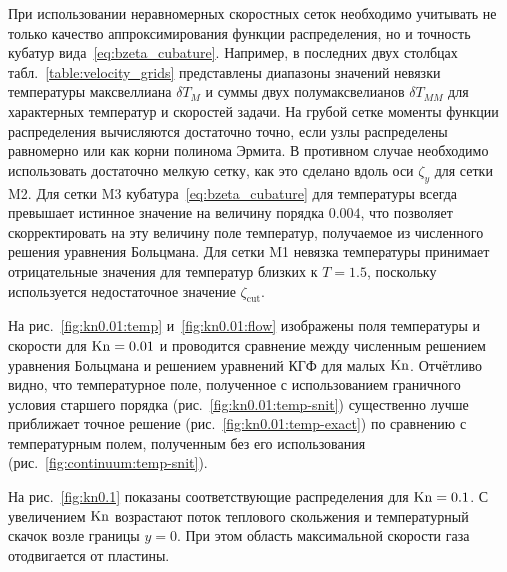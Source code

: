 При использовании неравномерных скоростных сеток необходимо учитывать не только качество аппроксимирования
функции распределения, но и точность кубатур вида~\eqref{eq:bzeta_cubature}.
Например, в последних двух столбцах табл.~\ref{table:velocity_grids} представлены диапазоны значений
невязки температуры максвеллиана \(\delta T_M\) и суммы двух полумаксвелианов \(\delta T_{MM}\)
для характерных температур и скоростей задачи.
На грубой сетке моменты функции распределения вычисляются достаточно точно,
если узлы распределены равномерно или как корни полинома Эрмита.
В противном случае необходимо использовать достаточно мелкую сетку,
как это сделано вдоль оси \(\zeta_y\) для сетки M2.
Для сетки M3 кубатура~\eqref{eq:bzeta_cubature} для температуры всегда превышает истинное значение
на величину порядка \(0.004\), что позволяет скорректировать на эту величину поле температур,
получаемое из численного решения уравнения Больцмана.
Для сетки M1 невязка температуры принимает отрицательные значения для температур близких к \(T=1.5\),
поскольку используется недостаточное значение \(\zeta_{\mathrm{cut}}\).

На рис.~\ref{fig:kn0.01:temp} и~\ref{fig:kn0.01:flow} изображены поля температуры и скорости
для \(\mathrm{Kn}=0.01\) и проводится сравнение между численным решением уравнения Больцмана
и решением уравнений КГФ для малых \(\mathrm{Kn}\).
Отчётливо видно, что температурное поле, полученное с использованием
граничного условия старшего порядка (рис.~\ref{fig:kn0.01:temp-snit})
существенно лучше приближает точное решение (рис.~\ref{fig:kn0.01:temp-exact})
по сравнению с температурным полем, полученным без его использования (рис.~\ref{fig:continuum:temp-snit}).

На рис.~\ref{fig:kn0.1} показаны соответствующие распределения для \(\mathrm{Kn}=0.1\).
С увеличением \(\mathrm{Kn}\) возрастают поток теплового скольжения и температурный скачок возле границы \(y=0\).
При этом область максимальной скорости газа отодвигается от пластины.

